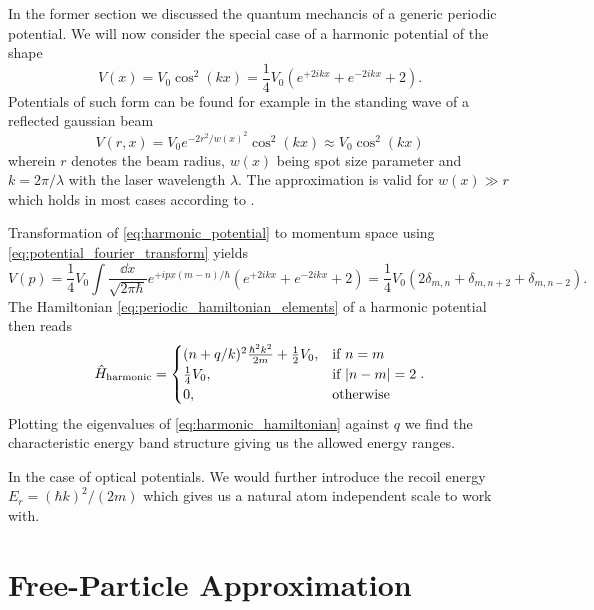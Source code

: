 In the former section we discussed the quantum mechancis of a generic
periodic potential. We will now consider the special case of a harmonic
potential of the shape
\begin{equation}
  V(x)
  =V_0\cos^2(kx)
  =\frac{1}{4}V_0\left(e^{+2ikx}+e^{-2ikx}+2\right)
  \label{eq:harmonic_potential}.
\end{equation}
Potentials of such form can be found for example in the standing wave of a
reflected gaussian beam
\begin{equation}
  V(r,x)
  =V_0e^{-2r^2/w(x)^2}\cos^2(kx)
  \approx V_0\cos^2(kx)
  \label{eq:optical_potential}
\end{equation}
wherein $r$ denotes the beam radius, $w(x)$ being spot size parameter and
$k=2\pi/\lambda$ with the laser wavelength $\lambda$. The approximation is
valid for $w(x)\gg r$ which holds in most cases according to
\cite[p.127]{Rom2009}.

Transformation of \cref{eq:harmonic_potential} to momentum space
using \cref{eq:potential_fourier_transform} yields
\begin{equation*}
  V(p)
  =
  \frac{1}{4}V_0
  \int\frac{\dd{x}}{\sqrt{2\pi\hbar}}
  e^{+ipx(m-n)/\hbar}\left(e^{+2ikx}+e^{-2ikx}+2\right)
  =
  \frac{1}{4}V_0\left(2\delta_{m,n}+\delta_{m,n+2}+\delta_{m,n-2}\right).
\end{equation*}
The Hamiltonian \cref{eq:periodic_hamiltonian_elements} of a
harmonic potential then reads
\begin{equation}
  \hat{H}_\text{harmonic}
  =\begin{cases}
    (n+q/k)^2\frac{\hbar^2k^2}{2m}+\frac{1}{2}V_0, & \text{if } n=m\\
    \frac{1}{4}V_0, & \text{if } \abs{n-m}=2\\
    0, & \text{otherwise}
  \end{cases}
  \label{eq:harmonic_hamiltonian}.
\end{equation}
Plotting the eigenvalues of \cref{eq:harmonic_hamiltonian} against
$q$ we find the characteristic energy band structure giving us the allowed
energy ranges.

In the case of optical potentials. We would further introduce the recoil
energy $E_r=(\hbar k)^2/(2m)$ which gives us a natural atom independent scale
to work with.

\section{Free-Particle Approximation}

